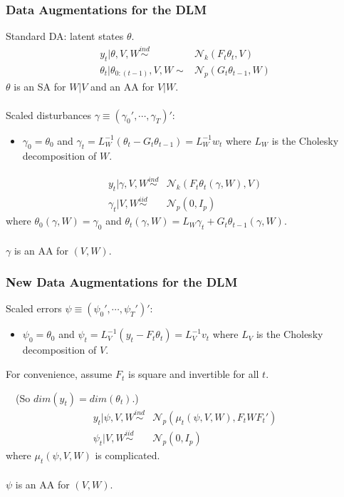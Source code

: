 \documentclass[xcolor=dvipsnames]{beamer}
\newcommand\N{\mathcal{N}}
\begin{document}
\begin{frame}
\frametitle{Data Augmentations for the DLM}
{\color{blue}Standard DA: latent states $\theta$.}
\begin{align*}
y_t|\theta,V,W \stackrel{ind}{\sim} &\N_k(F_t\theta_t,V)\\
\theta_t|\theta_{0:(t-1)},V,W \sim &\N_p(G_t\theta_{t-1},W)
\end{align*} 
{\color{blue}$\theta$ is an SA for $W|V$ and an AA for $V|W$.}\\~\\

{\color{blue}Scaled disturbances $\gamma\equiv(\gamma_0',\cdots,\gamma_T)'$: }
\begin{itemize}
\item[]$\gamma_0=\theta_0$ and $\gamma_t=L_W^{-1}(\theta_t - G_t\theta_{t-1})=L_W^{-1}w_t$ where $L_W$ is the Cholesky decomposition of $W$.
\end{itemize}
\begin{align*}
y_t|\gamma,V,W \stackrel{ind}{\sim} &\N_k(F_t\theta_t(\gamma,W),V)\\
\gamma_t|V,W \stackrel{iid}{\sim} &\N_p(0,I_p)
\end{align*} 
where $\theta_0(\gamma,W)=\gamma_0$ and $\theta_t(\gamma,W)=L_W\gamma_t + G_t\theta_{t-1}(\gamma,W)$.\\~\\

{\color{blue}$\gamma$ is an AA for $(V,W)$.}

\end{frame}

\begin{frame}
\frametitle{New Data Augmentations for the DLM}
{\color{blue}Scaled errors $\psi\equiv(\psi_0',\cdots,\psi_T')'$: }
\begin{itemize}
\item[]$\psi_0=\theta_0$ and $\psi_t=L_V^{-1}(y_t - F_t\theta_t)=L_V^{-1}v_t$ where $L_V$ is the Cholesky decomposition of $V$.
\end{itemize}
For convenience, assume $F_t$ is square and invertible for all $t$.
 
\ \ (So $dim(y_t)=dim(\theta_t)$.)
\begin{align*}
y_t|\psi,V,W \stackrel{ind}{\sim} &\N_p(\mu_t(\psi,V,W),F_tWF_t')\\
\psi_t|V,W \stackrel{iid}{\sim} &\N_p(0,I_p)
\end{align*} 
where $\mu_t(\psi,V,W)$ is complicated.\\~\\

{\color{blue}$\psi$ is an AA for $(V,W)$.}
\end{frame}
\end{document}
